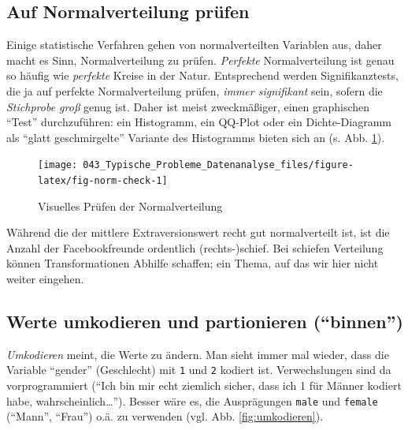 \documentclass[12pt,ngerman,]{book}
\theoremstyle{definition}
\theoremstyle{definition}
\theoremstyle{remark}
\begin{document}
\subsection{Auf Normalverteilung
prüfen}\label{auf-normalverteilung-prufen}

Einige statistische Verfahren gehen von normalverteilten Variablen aus,
daher macht es Sinn, Normalverteilung zu prüfen. \emph{Perfekte}
Normalverteilung ist genau so häufig wie \emph{perfekte} Kreise in der
Natur. Entsprechend werden Signifikanztests, die ja auf perfekte
Normalverteilung prüfen, \emph{immer signifikant} sein, sofern die
\emph{Stichprobe groß} genug ist. Daher ist meist zweckmäßiger, einen
graphischen ``Test'' durchzuführen: ein Histogramm, ein QQ-Plot oder ein
Dichte-Diagramm als ``glatt geschmirgelte'' Variante des Histogramms
bieten sich an (s. Abb. \ref{fig:fig-norm-check}).

\begin{figure}

{\centering \texttt{[image: 043\_Typische\_Probleme\_Datenanalyse\_files/figure-latex/fig-norm-check-1]} 

}

\caption{Visuelles Prüfen der Normalverteilung}\label{fig:fig-norm-check}
\end{figure}

Während die der mittlere Extraversionswert recht gut normalverteilt ist,
ist die Anzahl der Facebookfreunde ordentlich (rechts-)schief. Bei
schiefen Verteilung können Transformationen Abhilfe schaffen; ein Thema,
auf das wir hier nicht weiter eingehen.

\subsection{\texorpdfstring{Werte umkodieren und partionieren
(``binnen'')}{Werte umkodieren und partionieren (binnen)}}\label{werte-umkodieren-und-partionieren-binnen}

\emph{Umkodieren} meint, die Werte zu ändern. Man
sieht immer mal wieder, dass die Variable ``gender'' (Geschlecht) mit
\texttt{1} und \texttt{2} kodiert ist. Verwechslungen sind da
vorprogrammiert (``Ich bin mir echt ziemlich sicher, dass ich 1 für
Männer kodiert habe, wahrscheinlich\ldots{}''). Besser wäre es, die
Ausprägungen \texttt{male} und \texttt{female} (``Mann'', ``Frau'') o.ä.
zu verwenden (vgl. Abb. \ref{fig:umkodieren}).
\end{document}
